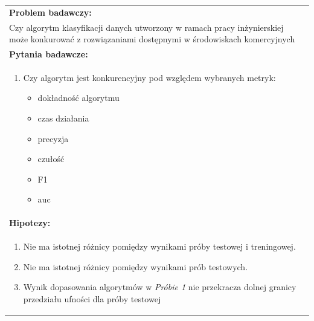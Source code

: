 \begin{table}[H]
    \centering
    \begin{tabular}{|L{\textwidth}|}
        \hline
        \textbf{Problem badawczy:}                                                                                                                     \\
        Czy algorytm klasyfikacji danych utworzony w ramach pracy inżynierskiej może konkurować z rozwiązaniami dostępnymi w środowiskach komercyjnych \\ \hline

        \textbf{Pytania badawcze:}                                                                                                                     \\
        \begin{enumerate}
            \item Czy algorytm jest konkurencyjny pod względem wybranych metryk:
            \begin{itemize}
                \item dokładność algorytmu
                \item czas działania
                \item precyzja
                \item czułość
                \item F1
                \item auc
            \end{itemize}
        \end{enumerate}                                                                                                                                \\ \hline

        \textbf{Hipotezy:}                                                                                                                             \\
        \begin{enumerate}
            \item Nie ma istotnej różnicy pomiędzy wynikami próby testowej i treningowej.
            \item Nie ma istotnej różnicy pomiędzy wynikami prób testowych.
            \item Wynik dopasowania algorytmów w \textit{Próbie 1} nie przekracza dolnej granicy przedziału ufności dla próby testowej
        \end{enumerate}                                                                                                                                \\ \hline
    \end{tabular}
    \label{tab:met-bad}
\end{table}



